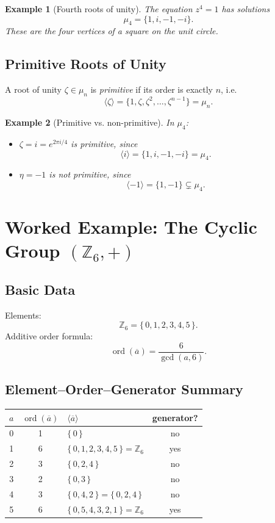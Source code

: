 \documentclass[12pt]{article}
\newtheorem{example}{Example}
\begin{document}
	\begin{example}[Fourth roots of unity]
		The equation $z^4=1$ has solutions
		$$
		\mu_4 = \{ 1, i, -1, -i \}.
		$$
		These are the four vertices of a square on the unit circle.
	\end{example}
	
	\subsection*{Primitive Roots of Unity}
	
	A root of unity $\zeta \in \mu_n$ is \emph{primitive} if its order is exactly $n$, i.e.
	$$
	\langle \zeta \rangle = \{1, \zeta, \zeta^2, \dots, \zeta^{n-1}\} = \mu_n.
	$$
	
	\begin{example}[Primitive vs. non-primitive]
		In $\mu_4$:
		\begin{itemize}
			\item $\zeta = i = e^{2\pi i/4}$ is primitive, since
			$$
			\langle i \rangle = \{1,i,-1,-i\} = \mu_4.
			$$
			\item $\eta = -1$ is not primitive, since
			$$
			\langle -1 \rangle = \{1,-1\} \subsetneq \mu_4.
			$$
		\end{itemize}
	\end{example}
	
	\section*{Worked Example: The Cyclic Group $(\mathbb{Z}_6,+)$}
	
	\subsection*{Basic Data}
	Elements:
	$$
	\mathbb{Z}_6=\{\,0,1,2,3,4,5\,\}.
	$$
	Additive order formula:
	$$
	\operatorname{ord}(\overline{a})=\frac{6}{\gcd(a,6)}.
	$$
	
	\subsection*{Element–Order–Generator Summary}
	\begin{center}
		\begin{tabular}{c|c|l|c}
			$a$ & $\operatorname{ord}(\overline{a})$ & $\langle \overline{a}\rangle$ & generator? \\ \hline
			0 & 1 & $\{\,0\,\}$ & no \\
			1 & 6 & $\{\,0,1,2,3,4,5\,\}=\mathbb{Z}_6$ & yes \\
			2 & 3 & $\{\,0,2,4\,\}$ & no \\
			3 & 2 & $\{\,0,3\,\}$ & no \\
			4 & 3 & $\{\,0,4,2\,\}=\{\,0,2,4\,\}$ & no \\
			5 & 6 & $\{\,0,5,4,3,2,1\,\}=\mathbb{Z}_6$ & yes \\
		\end{tabular}
	\end{center}
	
\end{document}
